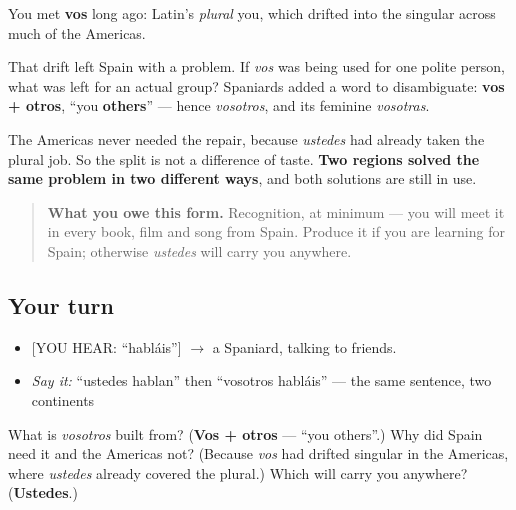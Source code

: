 \begin{cousinweb}
You met \textbf{vos} long ago: Latin's \emph{plural} you, which drifted into the singular across much of the Americas.

That drift left Spain with a problem. If \emph{vos} was being used for one polite person, what was left for an actual group? Spaniards added a word to disambiguate: \textbf{vos + otros}, \textquotedblleft{}you \textbf{others}\textquotedblright{} — hence \emph{vosotros}, and its feminine \emph{vosotras}.

The Americas never needed the repair, because \emph{ustedes} had already taken the plural job. So the split is not a difference of taste. \textbf{Two regions solved the same problem in two different ways}, and both solutions are still in use.

\begin{quote}
\textbf{What you owe this form.} Recognition, at minimum — you will meet it in every book, film and song from Spain. Produce it if you are learning for Spain; otherwise \emph{ustedes} will carry you anywhere.
\end{quote}
\end{cousinweb}

\subsection*{Your turn}
\begin{itemize}
\raggedright
  \item {[}YOU HEAR: \textquotedblleft{}habláis\textquotedblright{}{]} $\to$ a Spaniard, talking to friends.
  \item \emph{Say it:} \textquotedblleft{}ustedes hablan\textquotedblright{} then \textquotedblleft{}vosotros habláis\textquotedblright{} — the same sentence, two continents
\end{itemize}

\begin{tcolorbox}[breakable,colback=teal!4,colframe=teal!35!black,title={Before you move on}]
What is \emph{vosotros} built from? (\textbf{Vos + otros} — \textquotedblleft{}you others\textquotedblright{}.) Why did Spain need it and the Americas not? (Because \emph{vos} had drifted singular in the Americas, where \emph{ustedes} already covered the plural.) Which will carry you anywhere? (\textbf{Ustedes}.)
\end{tcolorbox}
